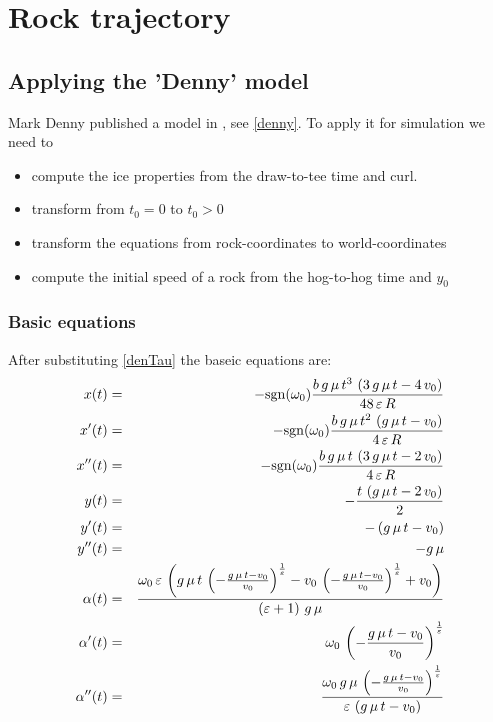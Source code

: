 \chapter{Rock trajectory}
\section{Applying the 'Denny' model}

Mark Denny published a model in \cite{denny:98}, see \ref{denny}. To apply it
for simulation we need to
\begin{itemize}
\item compute the ice properties from the draw-to-tee time and curl.
\item transform from $t_0 = 0$ to $t_0 > 0$
\item transform the equations from rock-coordinates to world-coordinates
\item compute the initial speed of a rock from the hog-to-hog time and $y_0$
\end{itemize}

\subsection{Basic equations}
After substituting \eqref{denTau} the baseic equations are:
\begin{eqnarray}
\eqlab{dennyX}
x(t) &=& -\sgn(\omega_0){{b\,g\,\mu\,t^3\,\left(3\,g\,\mu\,t-4\,v_{0}\right)}\over{48\,
 \varepsilon\,R}} \\
x'(t) &=& -\sgn(\omega_0){{b\,g\,\mu\,t^2\,\left(g\,\mu\,t-v_{0}\right)}\over{4\,\varepsilon
 \,R}} \\
x''(t) &=& -\sgn(\omega_0){{b\,g\,\mu\,t\,\left(3\,g\,\mu\,t-2\,v_{0}\right)}\over{4\,
 \varepsilon\,R}} \\
\eqlab{dennyY}
y(t) &=& -{{t\,\left(g\,\mu\,t-2\,v_{0}\right)}\over{2}} \\
y'(t) &=& -\left(g\,\mu\,t-v_{0}\right) \\
y''(t) &=& -g\,\mu \\
\alpha(t) &=& {{\omega_{0}\,\varepsilon\,\left(g\,\mu\,t\,\left(-{{g\,\mu\,t-v_{0
 }}\over{v_{0}}}\right)^{{{1}\over{\varepsilon}}}-v_{0}\,\left(-{{g\,
 \mu\,t-v_{0}}\over{v_{0}}}\right)^{{{1}\over{\varepsilon}}}+v_{0}
 \right)}\over{\left(\varepsilon+1\right)\,g\,\mu}} \\
\alpha'(t) &=& \omega_{0}\,\left(-{{g\,\mu\,t-v_{0}}\over{v_{0}}}\right)^{{{1
 }\over{\varepsilon}}} \\
\alpha''(t) &=& {{\omega_{0}\,g\,\mu\,\left(-{{g\,\mu\,t-v_{0}}\over{v_{0}}}\right)
 ^{{{1}\over{\varepsilon}}}}\over{\varepsilon\,\left(g\,\mu\,t-v_{0}
 \right)}}
\end{eqnarray}


